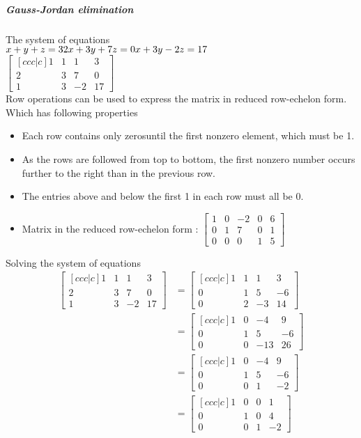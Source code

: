 \subparagraph{Gauss-Jordan elimination}
The system of equations \\
$
 x +  y +  z = 3 \\
2x + 3y + 7z = 0 \\
 x + 3y - 2z = 17
 $ \\
$
\begin{bmatrix} [ccc|c]
1 & 1 & 1 & 3 \\
2 & 3 & 7 & 0 \\
1 & 3 & -2 & 17
\end{bmatrix}
$ \\
Row operations can be used to express the matrix in reduced row-echelon form. \\
Which has following properties
\begin{itemize}
\item Each row contains only zerosuntil the first nonzero element, which must be 1.
\item As the rows are followed from top to bottom, the first nonzero number occurs further to the right than in the previous row.
\item The entries above and below the first 1 in each row must all be 0.
\item Matrix in the reduced row-echelon form :
$
\begin{bmatrix} 
1 & 0 & -2 & 0 & 6\\
0 & 1 & 7 & 0 & 1\\
0 & 0 & 0 & 1 & 5
\end{bmatrix}
$ \\
\end{itemize}

Solving the system of equations \\
\begin{align*}   
\begin{bmatrix} [ccc|c]
1 & 1 & 1 & 3 \\
2 & 3 & 7 & 0 \\
1 & 3 & -2 & 17
\end{bmatrix} 
&=
\begin{bmatrix} [ccc|c]
1 & 1 & 1 & 3 \\
0 & 1 & 5 & -6 \\
0 & 2 & -3 & 14
\end{bmatrix} \\
&=
\begin{bmatrix} [ccc|c]
1 & 0 & -4 & 9 \\
0 & 1 & 5 & -6 \\
0 & 0 & -13 & 26
\end{bmatrix} \\
&=
\begin{bmatrix} [ccc|c]
1 & 0 & -4 & 9 \\
0 & 1 & 5 & -6 \\
0 & 0 & 1 & -2
\end{bmatrix} \\
&=
\begin{bmatrix} [ccc|c]
1 & 0 & 0 & 1 \\
0 & 1 & 0 & 4 \\
0 & 0 & 1 & -2
\end{bmatrix}
\end{align*}   

